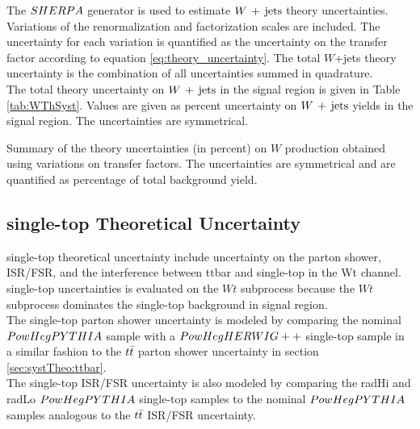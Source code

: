 \indent The $SHERPA$ generator is used to estimate $W\,+\,\mathrm{jets}$ theory uncertainties.  Variations of the renormalization and factorization scales are included.  The uncertainty for each variation is quantified as the uncertainty on the transfer factor according to equation \ref{eq:theory_uncertainty}.  The total $W$+jets theory uncertainty is the combination of all uncertainties summed in quadrature. \\

\indent The total theory uncertainty on $W\,+\,\mathrm{jets}$ in the signal region is given in Table \ref{tab:WThSyst}.  Values are given as percent uncertainty on $W\,+\,\mathrm{jets}$ yields in the signal region.  The uncertainties are symmetrical. \\

  \begin{table}[!h]
    \begin{center} \footnotesize
    
    \end{center}
    \caption{Summary of the theory uncertainties (in percent) on $W$ production obtained using variations on transfer factors. The uncertainties are symmetrical and are quantified as percentage of total background yield.}
    \label{tab:WThSyst}
  \end{table}        

\subsection{single-top Theoretical Uncertainty}

\indent single-top theoretical uncertainty include uncertainty on the parton shower, ISR/FSR, and the interference between ttbar and single-top in the Wt channel.  single-top uncertainties is evaluated on the $Wt$ subprocess because the $Wt$ subprocess dominates the single-top background in signal region.  \\

\indent The single-top parton shower uncertainty is modeled by comparing the nominal $PowHegPYTHIA$ sample with a $PowHegHERWIG++$ single-top sample in a similar fashion to the $t\bar{t}$ parton shower uncertainty in section \ref{sec:systTheo:ttbar}.  \\

\indent The single-top ISR/FSR uncertainty is also modeled by comparing the radHi and radLo $PowHegPYTHIA$ single-top samples to the nominal $PowHegPYTHIA$ samples analogous to the $t\bar{t}$ ISR/FSR uncertainty. \\


